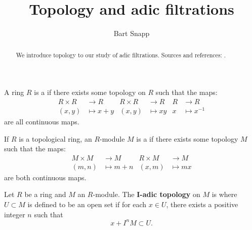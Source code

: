 \documentclass{ximera}
\author{Bart Snapp}
\title{Topology and adic filtrations}
\begin{document}
\begin{abstract}
  We introduce topology to our study of adic filtrations. Sources and
  references: \cite{sD2008,jpS2000}.
\end{abstract}
\maketitle

\begin{definition}
  A ring $R$ is a  if there exists some topology
  on $R$ such that the maps:
  \begin{align*}
    R\times R &\to R    & R\times R &\to R    & R &\to R\\
    (x,y) &\mapsto x+y  & (x,y) &\mapsto xy   & x &\mapsto x^{-1}
  \end{align*}
  are all continuous maps.
\end{definition}


\begin{definition}
  If $R$ is a topological ring, an $R$-module $M$ is a
   if there exists some topology $M$ such that
  the maps:
  \begin{align*}
    M\times M &\to M    & R\times M &\to M \\
    (m,n) &\mapsto m+n  & (x,m) &\mapsto mx 
  \end{align*}
  are both continuous maps.
\end{definition}


\begin{definition}
  Let $R$ be a ring and $M$ an $R$-module. The
  \textbf{$\boldsymbol{I}$-adic topology} on $M$ is where $U \subset
  M$ is defined to be an open set if for each $x\in U$, there exists a
  positive integer $n$ such that
  \[
  x + I^n M \subset U.
  \]
\end{definition}
\end{document}
